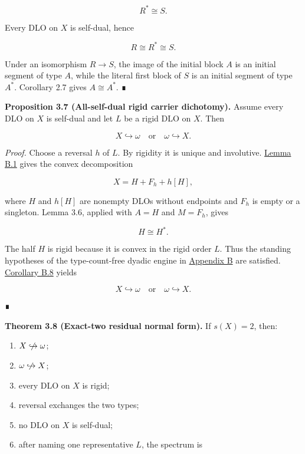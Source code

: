 \documentclass[
  english,
  11pt,
  reqno]{amsart}
\newcounter{none} %
\providecommand{\tightlist}{%
  \setlength{\itemsep}{0pt}\setlength{\parskip}{0pt}}
\providecommand{\nhookrightarrow}{\centernot\hookrightarrow}
\begin{document}
\[
R^*\cong S.
\]

Every DLO on \(X\) is self-dual, hence

\[
R\cong R^*\cong S.
\]

Under an isomorphism \(R\to S\), the image of the initial block \(A\) is
an initial segment of type \(A\), while the literal first block of \(S\)
is an initial segment of type \(A^*\). Corollary 2.7 gives
\(A\cong A^*\). ∎

\protect{}\label{prop:3-7-all-selfdual-dichotomy}

\textbf{Proposition 3.7 (All-self-dual rigid carrier dichotomy).} Assume
every DLO on \(X\) is self-dual and let \(L\) be a rigid DLO on \(X\).
Then

\[
X\hookrightarrow\omega
\quad\text{or}\quad
\omega\hookrightarrow X.
\]

\emph{Proof.} Choose a reversal \(h\) of \(L\). By rigidity it is unique
and involutive. \hyperref[lem:b-1-reflection-split]{Lemma B.1} gives the
convex decomposition

\[
X=H+F_h+h[H],
\]

where \(H\) and \(h[H]\) are nonempty DLOs without endpoints and \(F_h\)
is empty or a singleton. Lemma 3.6, applied with \(A=H\) and \(M=F_h\),
gives

\[
H\cong H^*.
\]

The half \(H\) is rigid because it is convex in the rigid order \(L\).
Thus the standing hypotheses of the type-count-free dyadic engine in
\hyperref[app:dyadic-engine]{Appendix B} are satisfied.
\hyperref[cor:b-8-dyadic-dichotomy]{Corollary B.8} yields

\[
X\hookrightarrow\omega
\quad\text{or}\quad
\omega\hookrightarrow X.
\]

∎

\protect{}\label{thm:3-8-residual-normal-form}

\textbf{Theorem 3.8 (Exact-two residual normal form).} If \(s(X)=2\),
then:

\begin{enumerate}
\tightlist
\item
  \(X\nhookrightarrow\omega\);
\item
  \(\omega\nhookrightarrow X\);
\item
  every DLO on \(X\) is rigid;
\item
  reversal exchanges the two types;
\item
  no DLO on \(X\) is self-dual;
\item
  after naming one representative \(L\), the spectrum is
\end{enumerate}
\end{document}
